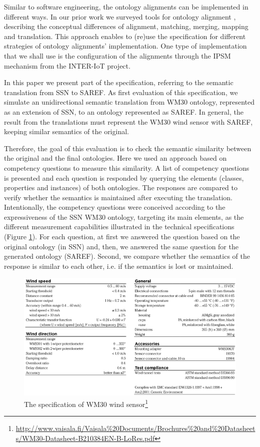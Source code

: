 \documentclass{sig-alternate-05-2015}
\begin{document}
Similar to software engineering, the ontology alignments can be implemented in different ways. In our prior work we surveyed tools for ontology alignment \cite{Ganzha2015}, describing the conceptual differences of alignment, matching, merging, mapping and translation. This approach enables to (re)use the specification for different strategies of ontology alignments’ implementation. One type of implementation that we shall use is the configuration of the alignments through the IPSM mechanism from the INTER-IoT project. 

In this paper we present part of the specification, referring to the semantic translation from SSN to SAREF. As first evaluation of this specification, we simulate an unidirectional semantic translation from WM30 ontology, represented as an extension of SSN, to an ontology represented as SAREF. In general, the result from the translations must represent the WM30 wind sensor with SAREF, keeping similar semantics of the original. 

Therefore, the goal of this evaluation is to check the semantic similarity between the original and the final ontologies. Here we used an approach based on competency questions to measure this similarity. A list of competency questions is presented and each question is responded by querying the elements (classes, properties and instances) of both ontologies. The responses are compared to verify whether the semantics is maintained after executing the translation. Intentionally, the competency questions were conceived according to the expressiveness of the SSN WM30 ontology, targeting its main elements, as the different measurement capabilities illustrated in the technical specifications (Figure \ref{fig:WM30specifications}). For each question, at first we answered the question based on the original ontology (in SSN) and, then, we answered the same question for the generated ontology (SAREF). Second, we compare whether the semantics of the response is similar to each other, i.e. if the semantics is lost or maintained. 

\begin{figure}[h!]
\centering
\includegraphics[scale=0.22]{WM30specifications}
\caption{The specification of WM30 wind sensor\footnote{\url{http://www.vaisala.fi/Vaisala\%20Documents/Brochures\%20and\%20Datasheets/WM30-Datasheet-B210384EN-B-LoRes.pdf}}}
\label{fig:WM30specifications}
\end{figure}
\end{document}
